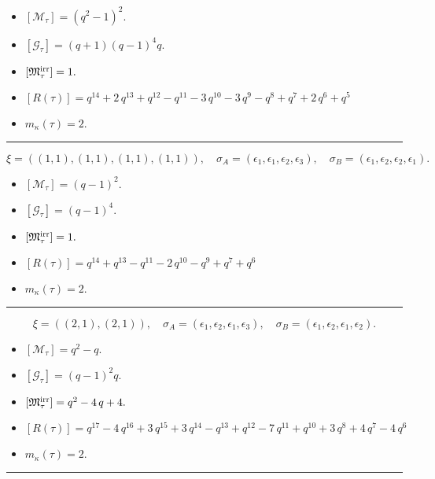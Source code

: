 \documentclass[10pt,a4paper]{amsart}
\begin{document}
\begin{itemize}
 \item $[\mathcal{M}_{\tau}] = {\left(q^{2} - 1\right)}^{2} .$

 \item $[\mathcal{G}_{\tau}] = {\left(q + 1\right)} {\left(q - 1\right)}^{4} q .$

 \item $[{\frak M}_{\tau}^{\textrm{irr}}] = 1 .$

 \item $[R(\tau)] = q^{14} + 2 \, q^{13} + q^{12} - q^{11} - 3 \, q^{10} - 3 \, q^{9} - q^{8} + q^{7} + 2 \, q^{6} + q^{5} $

 \item $m_{\kappa}(\tau) = 2 .$

 \end{itemize}
\noindent\rule{8cm}{0.4pt}

$$\xi = ({(1, 1), (1, 1)}, {(1, 1), (1, 1)}),\quad \sigma_A = ({{\epsilon_1}, {\epsilon_1}}, {{\epsilon_2}, {\epsilon_3}}),\quad \sigma_B = ({{\epsilon_1}, {\epsilon_2}}, {{\epsilon_2}, {\epsilon_1}}).$$

\begin{itemize}
 \item $[\mathcal{M}_{\tau}] = {\left(q - 1\right)}^{2} .$

 \item $[\mathcal{G}_{\tau}] = {\left(q - 1\right)}^{4} .$

 \item $[{\frak M}_{\tau}^{\textrm{irr}}] = 1 .$

 \item $[R(\tau)] = q^{14} + q^{13} - q^{11} - 2 \, q^{10} - q^{9} + q^{7} + q^{6} $

 \item $m_{\kappa}(\tau) = 2 .$

 \end{itemize}
\noindent\rule{8cm}{0.4pt}

$$\xi = ({(2, 1)}, {(2, 1)}),\quad \sigma_A = ({{\epsilon_1, \epsilon_2}}, {{\epsilon_1, \epsilon_3}}),\quad \sigma_B = ({{\epsilon_1, \epsilon_2}}, {{\epsilon_1, \epsilon_2}}).$$

\begin{itemize}
 \item $[\mathcal{M}_{\tau}] = q^{2} - q .$

 \item $[\mathcal{G}_{\tau}] = {\left(q - 1\right)}^{2} q .$

 \item $[{\frak M}_{\tau}^{\textrm{irr}}] = q^{2} - 4 \, q + 4 .$

 \item $[R(\tau)] = q^{17} - 4 \, q^{16} + 3 \, q^{15} + 3 \, q^{14} - q^{13} + q^{12} - 7 \, q^{11} + q^{10} + 3 \, q^{8} + 4 \, q^{7} - 4 \, q^{6} $

 \item $m_{\kappa}(\tau) = 2 .$

 \end{itemize}
\noindent\rule{8cm}{0.4pt}
\end{document}
